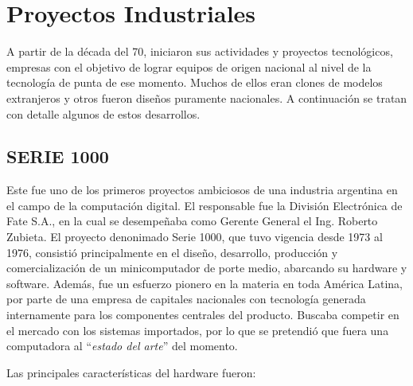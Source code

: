 \documentclass[%
  	final,
%
	notitlepage,
	narroweqnarray,
	inline,
 	twoside,
	]{ieee}
\begin{document}
\section{Proyectos Industriales}

A partir de la d\'ecada del 70, iniciaron sus actividades y proyectos tecnol\'ogicos, empresas con el objetivo de lograr equipos de origen nacional al nivel de la tecnolog\'ia de punta de ese momento. Muchos de ellos eran clones de modelos extranjeros y otros fueron dise\~nos puramente nacionales.
A continuaci\'on se tratan con detalle algunos de estos desarrollos.

\subsection*{SERIE 1000}

Este fue uno de los primeros proyectos ambiciosos de una industria argentina en el campo de la computaci\'on digital. El responsable fue la Divisi\'on Electr\'onica de Fate S.A., en la cual se desempe\~naba como Gerente General el Ing. Roberto Zubieta.
El proyecto denonimado Serie 1000\cite{s1000}, que tuvo vigencia desde 1973 al 1976, consisti\'o principalmente en el dise\~no, desarrollo, producci\'on y comercializaci\'on de un minicomputador de porte medio, abarcando su hardware y software. Adem\'as, fue un esfuerzo pionero en la materia en toda Am\'erica Latina, por parte de una empresa de capitales nacionales con tecnolog\'ia generada internamente para los componentes centrales del producto. Buscaba competir en el mercado con los sistemas importados, por lo que se pretendi\'o que fuera una computadora al ``\textit{estado del arte}'' del momento.

Las principales caracter\'isticas del hardware fueron:\\
\end{document}
